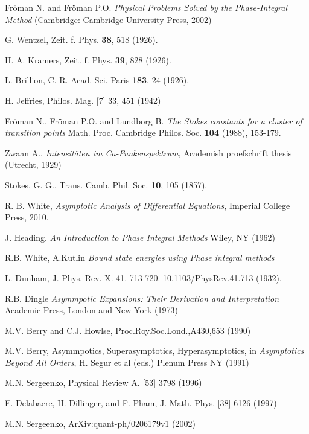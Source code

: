 \documentclass[atmp]{ipart_v1}
\begin{document}
\begin{thebibliography}{30}

 Fr\"oman N. and Fr\"oman P.O. \textit{Physical Problems Solved by the Phase-Integral Method} (Cambridge: Cambridge University Press, 2002)

 G. Wentzel, Zeit. f. Phys. \textbf{38}, 518 (1926).

 H. A. Kramers, Zeit. f. Phys. \textbf{39}, 828 (1926).

 L. Brillion, C. R. Acad. Sci. Paris \textbf{183}, 24 (1926).

 H. Jeffries, Philos. Mag. [7] 33, 451 (1942)

 Fr\"oman N., Fr\"oman P.O. and Lundborg B. \textit{The Stokes constants for a cluster of transition
points} Math. Proc. Cambridge Philos. Soc. \textbf{104} (1988), 153-179.

 Zwaan A., \textit{Intensit\"aten im Ca-Funkenspektrum}, Academish proefschrift thesis (Utrecht, 1929)

 Stokes, G. G., Trans. Camb. Phil. Soc. \textbf{10}, 105 (1857).

 R. B. White,
 {\it Asymptotic Analysis of Differential Equations}, Imperial College Press, 2010.

 J. Heading. {\it An Introduction to Phase Integral Methods} 
Wiley, NY (1962)

 R.B. White, A.Kutlin {\it Bound state energies using Phase integral methods} 

 L. Dunham, J. Phys. Rev. X. 41. 713-720. 10.1103/PhysRev.41.713 (1932).
 
 R.B. Dingle {\it Asymmpotic Expansions: Their Derivation and 
Interpretation} Academic Press, London and New York (1973)

 M.V. Berry and C.J. Howlse, Proc.Roy.Soc.Lond.,A430,653 (1990)

 M.V. Berry, Asymmpotics, Superasymptotics,
 Hyperasymptotics, in {\it Asymptotics Beyond All Orders}, H. Segur et al (eds.) Plenum Press NY (1991)

 M.N. Sergeenko, Physical Review A. [53] 3798 (1996)

 E. Delabaere, H. Dillinger, and F. Pham, J. Math. Phys. [38] 6126 (1997)

 M.N. Sergeenko, ArXiv:quant-ph/0206179v1 (2002)


\end{thebibliography}
\end{document}
